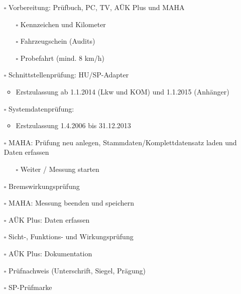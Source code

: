 \documentclass{vorlage-design-main}
\begin{document}
\begin{itemize}

\item[$\square$]
  Vorbereitung: Prüfbuch, PC, TV, AÜK Plus und MAHA

  \begin{itemize}

  \item[$\square$]
    Kennzeichen und Kilometer
  \item[$\square$]
    Fahrzeugschein (Audits)
  \item[$\square$]
    Probefahrt (mind. 8 km/h)
  \end{itemize}
\item[$\square$]
  Schnittstellenprüfung: HU/SP-Adapter

  \begin{itemize}

  \item
    Erstzulassung ab 1.1.2014 (Lkw und KOM) und 1.1.2015 (Anhänger)
  \end{itemize}
\item[$\square$]
  Systemdatenprüfung:

  \begin{itemize}

  \item
    Erstzulassung 1.4.2006 bis 31.12.2013
  \end{itemize}
\item[$\square$]
  MAHA: Prüfung neu anlegen, Stammdaten/Komplettdatensatz laden und
  Daten erfassen

  \begin{itemize}

  \item[$\square$]
    Weiter / Messung starten
  \end{itemize}
\item[$\square$]
  Bremswirkungsprüfung
\item[$\square$]
  MAHA: Messung beenden und speichern
\item[$\square$]
  AÜK Plus: Daten erfassen
\item[$\square$]
  Sicht-, Funktions- und Wirkungsprüfung
\item[$\square$]
  AÜK Plus: Dokumentation
\item[$\square$]
  Prüfnachweis (Unterschrift, Siegel, Prägung)
\item[$\square$]
  SP-Prüfmarke

  \begin{itemize}


\end{itemize}
\end{itemize}
\end{document}
